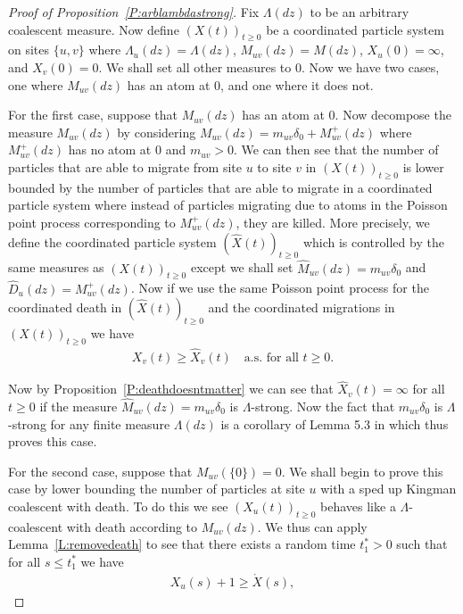 \documentclass[11pt]{article}
\theoremstyle{definition}
\newcommand{\lemref}[1]{Lemma~\ref{L:#1}}
\newcommand{\propref}[1]{Proposition~\ref{P:#1}}
\begin{document}
\begin{proof}[Proof of \propref{arblambdastrong}]
    Fix $\Lambda(dz)$ to be an arbitrary coalescent measure. Now define $(X(t))_{t \geq 0}$ be a coordinated particle system on sites $\{u,v\}$ where $\Lambda_u(dz) = \Lambda(dz)$, $M_{uv}(dz) = M(dz)$, $X_u(0) = \infty$, and $X_v(0) = 0$. We shall set all other measures to $0$. Now we have two cases, one where $M_{uv}(dz)$ has an atom at $0$, and one where it does not.
    \medskip

    \noindent For the first case, suppose that $M_{uv}(dz)$ has an atom at $0$. Now decompose the measure $M_{uv}(dz)$ by considering $M_{uv}(dz) = m_{uv}\delta_0 + M_{uv}^+(dz)$ where $M_{uv}^+(dz)$ has no atom at $0$ and $m_{uv} > 0$. We can then see that the number of particles that are able to migrate from site $u$ to site $v$ in $(X(t))_{t \geq 0}$ is lower bounded by the number of particles that are able to migrate in a coordinated particle system where instead of particles migrating due to atoms in the Poisson point process corresponding to $M_{uv}^+(dz)$, they are killed. More precisely, we define the coordinated particle system $(\widehat{X}(t))_{t \geq 0}$ which is controlled by the same measures as $(X(t))_{t \geq 0}$ except we shall set $\widehat{M}_{uv}(dz) = m_{uv}\delta_0$ and $\widehat{D}_u(dz) = M_{uv}^+(dz)$. Now if we use the same Poisson point process for the coordinated death in $(\widehat{X}(t))_{t \geq 0}$ and the coordinated migrations in $(X(t))_{t \geq 0}$ we have
    \begin{align*}
        X_v(t) \geq \widehat{X}_v(t) \quad \text{a.s. for all $t \geq 0$}.
    \end{align*}

    \noindent Now by \propref{deathdoesntmatter} we can see that $\widehat{X}_v(t) = \infty$ for all $t \geq 0$ if the measure $\widehat{M}_{uv}(dz) = m_{uv}\delta_0$ is $\Lambda$-strong. Now the fact that $m_{uv}\delta_0$ is $\Lambda$-strong for any finite measure $\Lambda(dz)$ is a corollary of Lemma 5.3 in \cite{Angel2012} which thus proves this case.
    \medskip
    
    \noindent For the second case, suppose that $M_{uv}(\{0\}) = 0$. We shall begin to prove this case by lower bounding the number of particles at site $u$ with a sped up Kingman coalescent with death. To do this we see $(X_u(t))_{t \geq 0}$ behaves like a $\Lambda$-coalescent with death according to $M_{uv}(dz)$. We thus can apply \lemref{removedeath} to see that there exists a random time $t^*_1 > 0$ such that for all $s \leq t^*_1$ we have
    \begin{align}\label{eq:plusone}
        X_u(s) + 1  \geq \mathring{X}(s),
    \end{align}


\end{proof}
\end{document}
